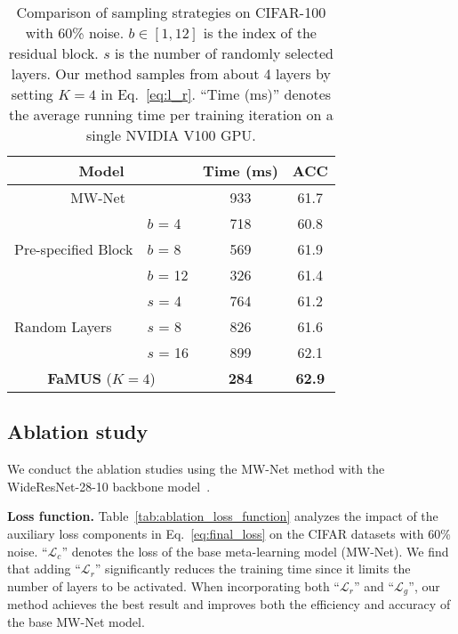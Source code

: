 \documentclass[final]{cvpr}
\begin{document}
\begin{table}[t]
	\centering
	\small
	\begin{tabular}{|l|l|c|c|}
		\hline
		\multicolumn{2}{|c|}{Model} & Time (ms) & ACC   \\
		\hline
        \multicolumn{2}{|c|}{MW-Net~\cite{shu2019meta}} & 933 & 61.7  \\
		\hline
		\multirow{3}{*}{ Pre-specified Block} & $b$ = 4  & 718 & 60.8  \\
                                           & $b$ = 8  & 569 & 61.9  \\
                                           & $b$ = 12 & 326 & 61.4  \\
        \hline
        \multirow{3}{*}{ Random Layers} & $s$ = 4  & 764 & 61.2  \\
                                       & $s$ = 8  & 826 & 61.6  \\
                                       & $s$ = 16 & 899 & 62.1  \\
		\hline\hline
		\multicolumn{2}{|c|}{\textbf{FaMUS} ($K=4$)} & \textbf{284} & \textbf{62.9}  \\  
		\hline
	\end{tabular}
	\vspace{-1mm}
	\caption{Comparison of sampling strategies on CIFAR-100 with 60\% noise. $b\in[1, 12]$ is the index of the residual block. $s$ is the number of randomly selected layers. Our method samples from about 4 layers by setting $K=4$ in Eq.~\eqref{eq:l_r}. ``Time (ms)'' denotes the average running time per training iteration on a single NVIDIA V100 GPU.
	}\label{tab:ablation_diff_accumulation}
	\vspace{-5mm}
\end{table}
 

\subsection{Ablation study}\label{sec:ablation_study}
We conduct the ablation studies using the MW-Net method with the WideResNet-28-10 backbone model~\cite{zagoruyko2016wide}.

\textbf{Loss function.} Table~\ref{tab:ablation_loss_function} analyzes the impact of the auxiliary loss components in Eq.~\eqref{eq:final_loss} on the CIFAR datasets with 60\% noise. ``$\mathcal{L}_c$'' denotes the loss of the base meta-learning model (MW-Net).
We find that adding ``$\mathcal{L}_r$'' significantly reduces the training time since it limits the number of layers to be activated. 
When incorporating both ``$\mathcal{L}_r$'' and ``$\mathcal{L}_g$'', our method achieves the best result and improves both the efficiency and accuracy of the base MW-Net model.
\end{document}
